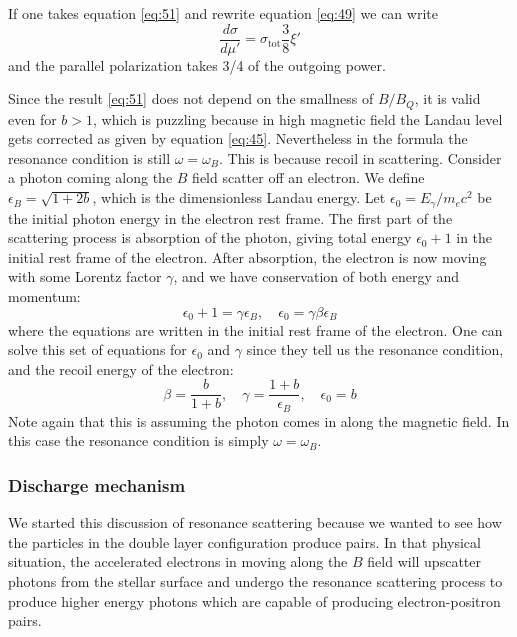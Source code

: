 \documentclass[letterpaper, 11pt]{article}
\numberwithin{equation}{section}
\numberwithin{figure}{section}
\begin{document}
If one takes equation \eqref{eq:51} and rewrite equation \eqref{eq:49} we can write
\begin{equation}
    \label{eq:55}
    \frac{d\sigma}{d\mu'} = \sigma_\mathrm{tot} \frac{3}{8}\xi'
\end{equation}
and the parallel polarization takes 3/4 of the outgoing power.

Since the result \eqref{eq:51} does not depend on the smallness of $B/B_Q$, it is valid even for $b> 1$, which is puzzling because in high magnetic field the Landau level gets corrected as given by equation \eqref{eq:45}. Nevertheless in the formula the resonance condition is still $\omega = \omega_B$. This is because recoil in scattering. Consider a photon coming along the $B$ field scatter off an electron. We define $\epsilon_B = \sqrt{1 + 2b}$, which is the dimensionless Landau energy. Let $\epsilon_0 = E_{\gamma}/m_ec^2$ be the initial photon energy in the electron rest frame. The first part of the scattering process is absorption of the photon, giving total energy $\epsilon_0 + 1$ in the initial rest frame of the electron. After absorption, the electron is now moving with some Lorentz factor $\gamma$, and we have conservation of both energy and momentum:
\begin{equation}
    \label{eq:56}
    \epsilon_0 + 1 = \gamma\epsilon_B,\quad \epsilon_0 = \gamma\beta\epsilon_B
\end{equation}
where the equations are written in the initial rest frame of the electron. One can solve this set of equations for $\epsilon_0$ and $\gamma$ since they tell us the resonance condition, and the recoil
energy of the electron:
\begin{equation}
    \label{eq:58}
    \beta = \frac{b}{1 + b},\quad \gamma = \frac{1 + b}{\epsilon_B}, \quad \epsilon_0 = b
\end{equation}
Note again that this is assuming the photon comes in along the magnetic field. In this case the resonance condition is simply $\omega = \omega_B$.

\subsubsection{Discharge mechanism}
\label{sec:discharge-mech}

We started this discussion of resonance scattering because we wanted to see how the particles in the double layer configuration produce pairs. In that physical situation, the accelerated electrons in moving along the $B$ field will upscatter photons from the stellar surface and undergo the resonance scattering process to produce higher energy photons which are capable of producing electron-positron pairs.
\end{document}
